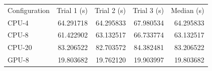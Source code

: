 \begin{tabular}{lrrrr}
\toprule
Configuration & Trial 1 (s) & Trial 2 (s) & Trial 3 (s) & Median (s) \\
CPU-4 & 64.291718 & 64.295833 & 67.980534 & 64.295833 \\
CPU-8 & 61.422902 & 63.132517 & 66.733774 & 63.132517 \\
CPU-20 & 83.206522 & 82.703572 & 84.382481 & 83.206522 \\
GPU-8 & 19.803682 & 19.762120 & 19.903997 & 19.803682 \\
\bottomrule
\end{tabular}
